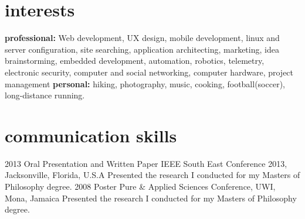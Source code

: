 \documentclass[]{friggeri-cv} %
\begin{document}

\section{interests}

\textbf{professional:} Web development, UX design, mobile development, linux and server configuration, site searching, application architecting, marketing, idea brainstorming, embedded development, automation, robotics, telemetry, electronic security, computer and social networking, computer hardware, project management
\textbf{personal:} hiking, photography, music, cooking, football(soccer), long-distance running.





\section{communication skills}

\begin{entrylist}
\entry
{2013}
{Oral Presentation and Written Paper}
{IEEE South East Conference 2013, Jacksonville, Florida, U.S.A}
{Presented the research I conducted for my Masters of Philosophy degree.}
\entry
{2008}
{Poster}
{Pure \& Applied Sciences Conference, UWI, Mona, Jamaica}
{Presented the research I conducted for my Masters of Philosophy degree.}
\end{entrylist}
\end{document}
